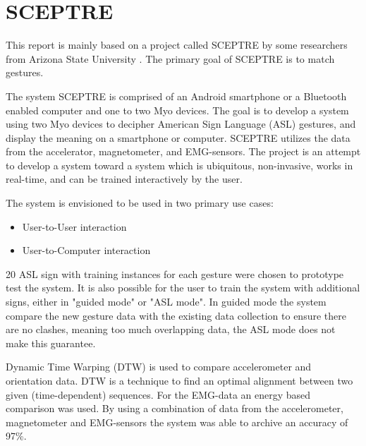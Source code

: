 \section{SCEPTRE}
This report is mainly based on a project called SCEPTRE by some researchers from Arizona State University \cite{paudyal2016sceptre}. The primary goal of SCEPTRE is to match gestures.

The system SCEPTRE is comprised of an Android smartphone or a Bluetooth enabled computer and one to two Myo devices. The goal is to develop a system using two Myo devices to decipher American Sign Language (ASL) gestures, and display the meaning on a smartphone or computer. SCEPTRE utilizes the data from the accelerator, magnetometer, and EMG-sensors. The project is an attempt to develop a system toward a system which is ubiquitous, non-invasive, works in real-time, and can be trained interactively by the user. 

The system is envisioned to be used in two primary use cases:
\begin{itemize}
    \item User-to-User interaction
    \item User-to-Computer interaction
\end{itemize}

20 ASL sign with training instances for each gesture were chosen to prototype test the system. It is also possible for the user to train the system with additional signs, either in "guided mode" or "ASL mode". In guided mode the system compare the new gesture data with the existing data collection to ensure there are no clashes, meaning too much overlapping data, the ASL mode does not make this guarantee.

Dynamic Time Warping (DTW) is used to compare accelerometer and orientation data. DTW is a technique to find an optimal alignment between two given (time-dependent) sequences. For the EMG-data an energy based comparison was used. By using a combination of data from the accelerometer, magnetometer and EMG-sensors the system was able to archive an accuracy of 97\%. 